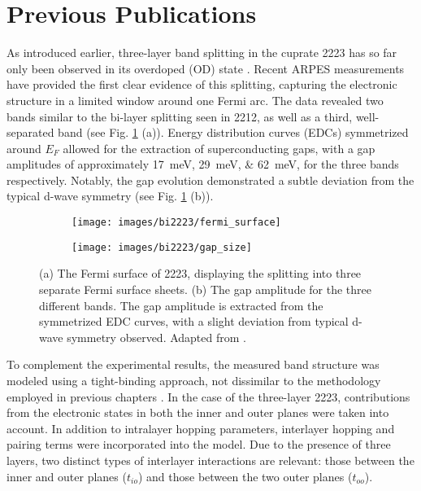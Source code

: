 \section{Previous Publications}

As introduced earlier, three-layer band splitting in the cuprate 2223 has so far only been observed in its overdoped (OD) state \cite{luo_electronic_2023}.
Recent ARPES measurements have provided the first clear evidence of this splitting, capturing the electronic structure in a limited window around one Fermi arc.
The data revealed two bands similar to the bi-layer splitting seen in 2212, as well as a third, well-separated band (see Fig. \ref{fig:arpes_sketch} (a)).
Energy distribution curves (EDCs) symmetrized around $E_F$ allowed for the extraction of superconducting gaps, with a gap amplitudes of approximately \qtylist{17;29;62}{\milli\electronvolt}, for the three bands respectively.
Notably, the gap evolution demonstrated a subtle deviation from the typical d-wave symmetry (see Fig. \ref{fig:arpes_sketch} (b)).

\begin{figure}[t]
	\centering
	\begin{subfigure}[b]{0.4\textwidth}
		\texttt{[image: images/bi2223/fermi\_surface]}
		\caption{}
	\end{subfigure}
	\begin{subfigure}[b]{0.3\textwidth}
		\texttt{[image: images/bi2223/gap\_size]}
		\caption{}
	\end{subfigure}
	\caption{(a) The Fermi surface of 2223, displaying the splitting into three separate Fermi surface sheets. (b) The gap amplitude for the three different bands. The gap amplitude is extracted from the symmetrized EDC curves, with a slight deviation from typical d-wave symmetry observed. Adapted from \cite{luo_electronic_2023}.}
	\label{fig:arpes_sketch}
\end{figure}

To complement the experimental results, the measured band structure was modeled using a tight-binding approach, not dissimilar to the methodology employed in previous chapters \cite{luo_subtle_2021}.
In the case of the three-layer 2223, contributions from the electronic states in both the inner and outer  planes were taken into account.
In addition to intralayer hopping parameters, interlayer hopping and pairing terms were incorporated into the model.
Due to the presence of three layers, two distinct types of interlayer interactions are relevant: those between the inner and outer planes ($t_{io}$) and those between the two outer planes ($t_{oo}$).

